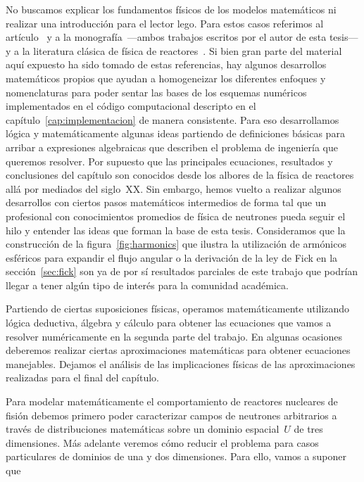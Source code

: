 No buscamos explicar los fundamentos físicos de los modelos matemáticos ni realizar una introducción para el lector lego. Para estos casos referimos al artículo~\cite{enief-2013-cpl} y a la monografía~\cite{monografia}---ambos trabajos escritos por el autor de esta tesis---y a la literatura clásica de física de reactores~\cite{henry,lamarsh,duderstadt,glasstone,lewis,stammler}. Si bien gran parte del material aquí expuesto ha sido tomado de estas referencias, hay algunos desarrollos matemáticos propios que ayudan a homogeneizar los diferentes enfoques y nomenclaturas   para poder sentar las bases de los esquemas numéricos implementados en el código computacional descripto en el capítulo~\ref{cap:implementacion} de manera consistente. Para eso desarrollamos lógica y matemáticamente algunas ideas partiendo de definiciones básicas para arribar a expresiones algebraicas que describen el problema de ingeniería que queremos resolver. Por supuesto que las principales ecuaciones, resultados y conclusiones del capítulo son conocidos desde los albores de la física de reactores allá por mediados del siglo~XX. Sin embargo, hemos vuelto a realizar algunos desarrollos con ciertos pasos matemáticos intermedios de forma tal que un profesional con conocimientos promedios de física de neutrones pueda seguir el hilo y entender las ideas que forman la base de esta tesis. Consideramos que la construcción de la figura~\ref{fig:harmonics} que ilustra la utilización de armónicos esféricos para expandir el flujo angular o la derivación de la ley de Fick en la sección~\ref{sec:fick} son ya de por sí resultados parciales de este trabajo que podrían llegar a tener algún tipo de interés para la comunidad académica.

Partiendo de ciertas suposiciones físicas, operamos matemáticamente utilizando lógica deductiva, álgebra y cálculo para obtener las ecuaciones que vamos a resolver numéricamente en la segunda parte del trabajo. En algunas ocasiones deberemos realizar ciertas aproximaciones matemáticas para obtener ecuaciones manejables. Dejamos el análisis de las implicaciones físicas de las aproximaciones realizadas para el final del capítulo.

\bigskip

Para modelar matemáticamente el comportamiento de reactores nucleares de fisión debemos primero poder caracterizar campos de neutrones arbitrarios a través de distribuciones matemáticas sobre un dominio espacial~$U$ de tres dimensiones. Más adelante veremos cómo reducir el problema para casos particulares de dominios de una y dos dimensiones.
Para ello, vamos a suponer que~\cite{lewis}

